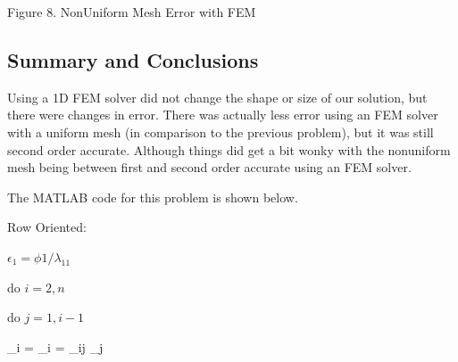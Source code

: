 \documentclass[11pt, oneside]{article}   	%
\begin{document}
\begin{enumerate}
\centerline {}
\centerline{Figure 8. NonUniform Mesh Error with FEM}

\subsection{Summary and Conclusions}

Using a 1D FEM solver did not change the shape or size of our solution, but there were changes in error. There was actually less error using an FEM solver with a uniform mesh (in comparison to the previous problem), but it was still second order accurate. Although things did get a bit wonky with the nonuniform mesh being between first and second order accurate using an FEM solver.

\vspace{2mm}

The MATLAB code for this problem is shown below.





\end{enumerate}

Row Oriented:

$\epsilon_1 = \phi1/\lambda_{11}$

do $i = 2,n$

\quad do $j = 1, i-1$

\quad \quad \phi_i = \phi_i = \lambda_{ij} \epilon_j
\end{document}
